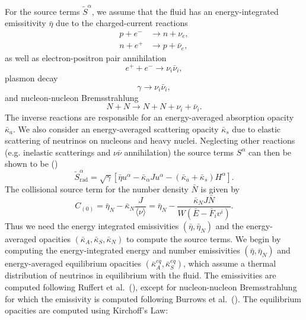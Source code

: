 For the source terms $\tilde{S}^\alpha$, we assume that the fluid has an energy-integrated emissitivity $\bar \eta$ due to the charged-current reactions
%
\begin{align}
  p + e^- &\rightarrow n + \nu_e, \\
  n + e^+ &\rightarrow p + \bar{\nu}_e,
\end{align}
%
as well as electron-positron pair annihilation
%
\begin{equation}
  e^+ + e^- \rightarrow \nu_i \bar \nu_i,
\end{equation}
%
plasmon decay
%
\begin{equation}
  \gamma \rightarrow \nu_i\bar \nu_i,
\end{equation}
%
and nucleon-nucleon Bremsstrahlung
%
\begin{equation}
  N + N \rightarrow N + N + \nu_i + \bar \nu_i.
\end{equation}
%
The inverse reactions are responsible for an energy-averaged absorption opacity $\bar \kappa_a$. We also consider an energy-averaged scattering opacity $\bar \kappa_s$ due to elastic scattering of neutrinos on nucleons and heavy nuclei. Neglecting other reactions (e.g. inelastic scatterings and $\nu\bar\nu$ annihilation) the source terms $S^\alpha$ can then be shown to be (\citet*{shibata2011truncated})
%
\begin{equation}
  \tilde S_\text{rad}^\alpha = \sqrt{\gamma} [\bar \eta u^\alpha - \bar \kappa_\alpha J u^\alpha - (\bar \kappa_a + \bar \kappa_s) H^\alpha].
\end{equation}
%
The collisional source term for the number density $\bar N$ is given by
%
\begin{equation}
  C_{(0)} = \bar \eta_N - \bar \kappa_N \frac{J}{\langle\nu\rangle} = \bar \eta_N - \frac{\bar \kappa_N J \bar N}{W(\bar E - \bar F_iv^i)}.
\end{equation}
%
Thus we need the energy integrated emissivities $(\bar \eta, \bar \eta_N)$ and the energy-averaged opacities $(\bar \kappa_A, \bar \kappa_S, \bar \kappa_N)$ to compute the source terms. 
We begin by computing the energy-integrated energy and number emissivities $(\bar \eta, \bar \eta_N)$ and energy-averaged equilibrium opacities $(\bar \kappa^{eq}_A, \bar \kappa^{eq}_S)$, which assume a thermal distribution of neutrinos in equilibrium with the fluid. The emissivities are computed following Ruffert et al.~(\citet*{ruffert1996}), except for nucleon-nucleon Bremsstrahlung for which the emissivity is computed following Burrows et al.~(\citet*{burrows2006b}). The equilibrium opacities are computed using Kirchoff's Law:

